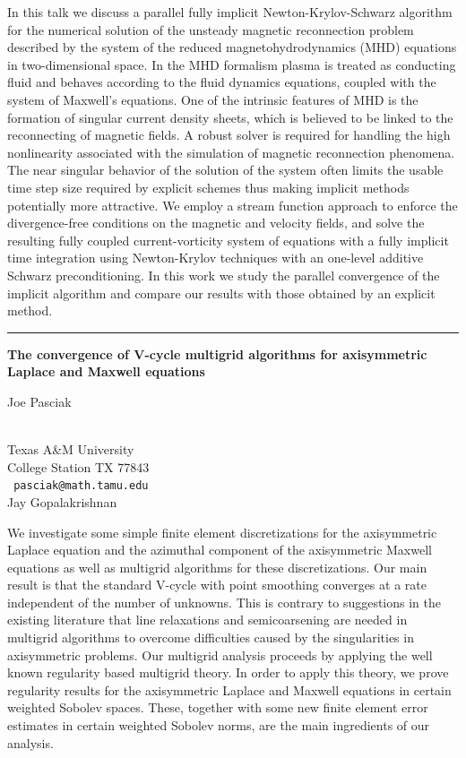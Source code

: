 \documentclass[twosided]{report}
\begin{document}
In this talk we discuss a parallel fully implicit Newton-Krylov-Schwarz
algorithm for the numerical solution of the unsteady magnetic
reconnection problem described by the system of the reduced
magnetohydrodynamics (MHD) equations in two-dimensional space. In the
MHD formalism plasma is treated as conducting fluid and behaves
according to the fluid dynamics equations, coupled with the system of
Maxwell’s equations. One of the intrinsic features of MHD is
the formation of singular current density sheets, which is believed to
be linked to the reconnecting of magnetic fields. A robust solver is
required for handling the high nonlinearity associated with the
simulation of magnetic reconnection phenomena. The near singular
behavior of the solution of the system often limits the usable time
step size required by explicit schemes thus making implicit methods
potentially more attractive. We employ a stream function approach to
enforce the divergence-free conditions on the magnetic and velocity
fields, and solve the resulting fully coupled current-vorticity system
of equations with a fully implicit time integration using Newton-Krylov
techniques with an one-level additive Schwarz preconditioning. In this
work we study the parallel convergence of the implicit algorithm and
compare our results with those obtained by an explicit method.

\begin{center}

\rule{6in}{1pt}
\end{center}

\begin{center}
{\large			\label{pasciak}
{\bf
The convergence of V-cycle multigrid algorithms for axisymmetric
Laplace and Maxwell equations
}

Joe Pasciak} \\
Texas A\&M University \\ College Station TX 77843
\\ {\tt
pasciak@math.tamu.edu
}
\\
Jay Gopalakrishnan
\end{center}


We investigate some simple finite element discretizations for
the axisymmetric Laplace equation and the azimuthal component of the
axisymmetric Maxwell equations as well as multigrid algorithms for
these discretizations. Our main result is that the standard V-cycle
with point smoothing converges at a rate independent of the number of
unknowns. This is contrary to suggestions in the existing literature
that line relaxations and semicoarsening are needed in multigrid
algorithms to overcome difficulties caused by the singularities in
axisymmetric problems. Our multigrid analysis proceeds by applying the
well known regularity based multigrid theory. In order to apply this
theory, we prove regularity results for the axisymmetric Laplace and
Maxwell equations in certain weighted Sobolev spaces. These, together
with some new finite element error estimates in certain weighted
Sobolev norms, are the main ingredients of our analysis.
\end{document}
